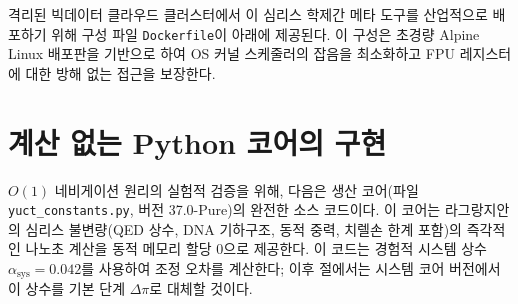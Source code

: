 \documentclass[11pt,a4paper]{article}
\begin{document}
	격리된 빅데이터 클라우드 클러스터에서 이 심리스 학제간 메타 도구를 산업적으로 배포하기 위해 구성 파일 \texttt{Dockerfile}이 아래에 제공된다. 이 구성은 초경량 Alpine Linux 배포판을 기반으로 하여 OS 커널 스케줄러의 잡음을 최소화하고 FPU 레지스터에 대한 방해 없는 접근을 보장한다.
	
	\section{계산 없는 Python 코어의 구현}
	\(O(1)\) 네비게이션 원리의 실험적 검증을 위해, 다음은 생산 코어(파일 \texttt{yuct\_constants.py}, 버전 37.0-Pure)의 완전한 소스 코드이다. 이 코어는 라그랑지안의 심리스 불변량(QED 상수, DNA 기하구조, 동적 중력, 치렐손 한계 포함)의 즉각적인 나노초 계산을 동적 메모리 할당 0으로 제공한다. 이 코드는 경험적 시스템 상수 \(\alpha_{\text{sys}} = 0.042\)를 사용하여 조정 오차를 계산한다; 이후 절에서는 시스템 코어 버전에서 이 상수를 기본 단계 \(\Delta\pi\)로 대체할 것이다.
	
\end{document}
